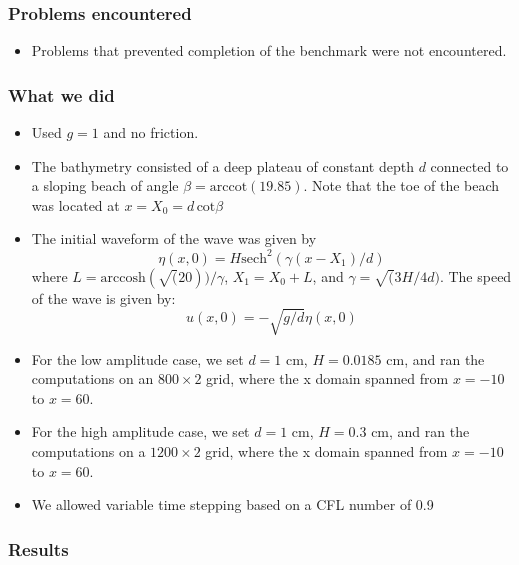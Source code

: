 \subsubsection{Problems encountered}

\begin{itemize}
\item Problems that prevented completion of the benchmark were not encountered.
\end {itemize}

\subsubsection{What we did}

\begin{itemize}
\item Used $g=1$ and no friction.
\item The bathymetry consisted of a deep plateau of constant depth $d$
connected to a sloping beach of angle $\beta = \text{arccot}(19.85)$.
Note that the toe of the beach was located at $x = X_0 = d\, \text{cot} \beta$
\item The initial waveform of the wave was given by 
\begin{equation}
\eta(x,0) = H \text{sech}^2(\gamma (x - X_1)/d)
\end{equation}
where $L = \text{arccosh}(\sqrt(20))/\gamma$, $X_1 = X_0 + L$, 
and $\gamma = \sqrt(3H/4d)$. The speed of the wave is given by: 
\begin{equation}
u(x,0)=-\sqrt{g/d}\eta(x,0)
\end{equation}
\item For the low amplitude case, we set $d = 1$ cm, $H = 0.0185$ cm, and
ran the computations on an $800\times 2$ grid, where the x domain
spanned from $x = -10$ to $x = 60$.
\item For the high amplitude case, we set $d = 1$ cm, $H = 0.3$ cm,
and ran the computations on a $1200\times 2$ grid, where the x domain
spanned from $x = -10$ to $x = 60$.
\item We allowed variable time stepping based on a CFL number of 0.9
\end{itemize} 

\subsubsection{Results}

